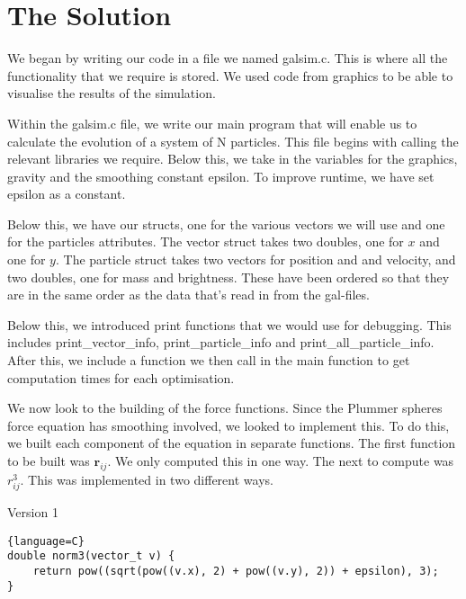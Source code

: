 \section{The Solution}
We began by writing our code in a file we named galsim.c. This is where all the functionality that we require is stored. We used code from graphics to be able to visualise the results of the simulation.

Within the galsim.c file, we write our main program that will enable us to calculate the evolution of a system of N particles. This file begins with calling the relevant libraries we require. Below this, we take in the variables for the graphics, gravity and the smoothing constant epsilon. To improve runtime, we have set epsilon as a constant.

Below this, we have our structs, one for the various vectors we will use and one for the particles attributes. The vector struct takes two doubles, one for $x$ and one for $y$. The particle struct takes two vectors for position and and velocity, and two doubles, one for mass and brightness. These have been ordered so that they are in the same order as the data that's read in from the gal-files.

Below this, we introduced print functions that we would use for debugging. This includes print\_vector\_info, print\_particle\_info and print\_all\_particle\_info. After this, we include a function we then call in the main function to get computation times for each optimisation.

We now look to the building of the force functions. Since the Plummer spheres force equation has smoothing involved, we looked to implement this. To do this, we built each component of the equation in separate functions. The first function to be built was $\boldsymbol{r}_{ij}$. We only computed this in one way. The next to compute was $r_{ij}^{3}$. This was implemented in two different ways.
\begin{center}
    Version 1
\end{center}
\begin{lstlisting}{language=C}
double norm3(vector_t v) {
    return pow((sqrt(pow((v.x), 2) + pow((v.y), 2)) + epsilon), 3);
}
\end{lstlisting}

